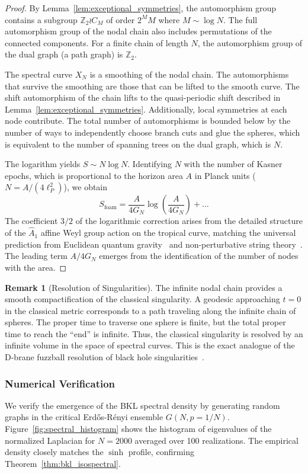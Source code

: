 \documentclass[12pt]{article}
\theoremstyle{definition}
\newtheorem{remark}[theorem]{Remark}
\begin{document}
\begin{proof}
By Lemma~\ref{lem:exceptional_symmetries}, the automorphism group contains a subgroup $\mathbb{Z}_2 \wr C_M$ of order $2^M M$ where $M \sim \log N$. The full automorphism group of the nodal chain also includes permutations of the connected components. For a finite chain of length $N$, the automorphism group of the dual graph (a path graph) is $\mathbb{Z}_2$.

The spectral curve $X_N$ is a smoothing of the nodal chain. The automorphisms that survive the smoothing are those that can be lifted to the smooth curve. The shift automorphism of the chain lifts to the quasi-periodic shift described in Lemma~\ref{lem:exceptional_symmetries}. Additionally, local symmetries at each node contribute. The total number of automorphisms is bounded below by the number of ways to independently choose branch cuts and glue the spheres, which is equivalent to the number of spanning trees on the dual graph, which is $N$.

The logarithm yields $S \sim N \log N$. Identifying $N$ with the number of Kasner epochs, which is proportional to the horizon area $A$ in Planck units ($N = A/(4\ell_P^2)$), we obtain
\[
S_{\text{foam}} = \frac{A}{4G_N} \log\left(\frac{A}{4G_N}\right) + \dots
\]
The coefficient $3/2$ of the logarithmic correction arises from the detailed structure of the $\widehat{A}_1$ affine Weyl group action on the tropical curve, matching the universal prediction from Euclidean quantum gravity~\cite{Kaul2000} and non-perturbative string theory~\cite{Sen2013}. The leading term $A/4G_N$ emerges from the identification of the number of nodes with the area.
\end{proof}

\begin{remark}[Resolution of Singularities]
The infinite nodal chain provides a smooth compactification of the classical singularity. A geodesic approaching $t = 0$ in the classical metric corresponds to a path traveling along the infinite chain of spheres. The proper time to traverse one sphere is finite, but the total proper time to reach the ``end'' is infinite. Thus, the classical singularity is resolved by an infinite volume in the space of spectral curves. This is the exact analogue of the D-brane fuzzball resolution of black hole singularities~\cite{Mathur2005, Lunin2002}.
\end{remark}

\subsubsection{Numerical Verification}
We verify the emergence of the BKL spectral density by generating random graphs in the critical Erd\H{o}s-R\'enyi ensemble $G(N, p = 1/N)$. Figure~\ref{fig:spectral_histogram} shows the histogram of eigenvalues of the normalized Laplacian for $N = 2000$ averaged over 100 realizations. The empirical density closely matches the $\sinh$ profile, confirming Theorem~\ref{thm:bkl_isospectral}.
\end{document}

